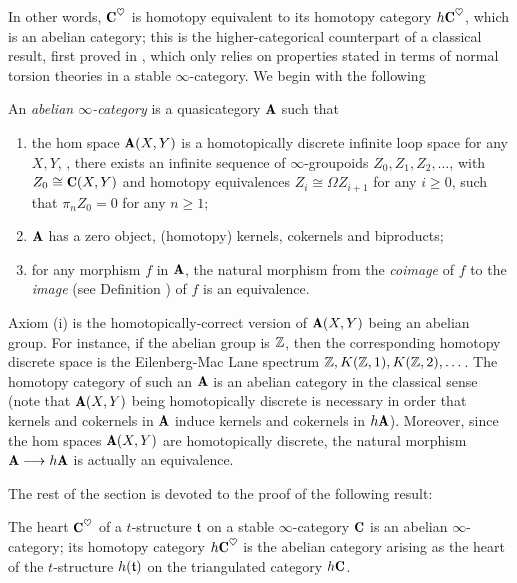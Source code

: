 In other words, $\C^\heart$ is homotopy equivalent to its homotopy category $h\C^\heart$, which is an abelian category; this is the higher-categorical counterpart of a classical result, first proved in \cite[Thm. \textbf{1.3.6}]{BBDPervers}, 
which 
only relies on properties stated in terms of normal torsion theories in a stable $\infty$-category. We begin with the following
\begin{definition}\label{df:abelinfty}
An \emph{abelian $\infty$-category} is a quasicategory $\cate{A}$ such that
\begin{enumerate}
\item the hom space $\cate{A}(X,Y)$ is a homotopically discrete infinite loop space for any $X, Y$, \ie, there exists an infinite sequence of $\infty$-groupoids $Z_0, Z_1,Z_2,\dots$, with $Z_0\cong \C(X,Y)$ and homotopy equivalences $Z_i\cong \Omega Z_{i+1}$ for any $i\geq 0$, such that $\pi_n Z_0=0$ for any $n\geq 1$;
\item $\cate{A}$ has a zero object, (homotopy) kernels, cokernels and biproducts;
\item for any morphism $f$ in $\cate{A}$, the natural morphism from the \emph{coimage} of $f$ to the \emph{image} (see Definition ) of $f$ is an equivalence.
\end{enumerate}
\end{definition}
\begin{remark}
Axiom (i) is the homotopically-correct version of $\cate{A}(X,Y)$ being an abelian group. For instance, if the abelian group is $\mathbb{Z} $, then the corresponding homotopy discrete space is the Eilenberg-Mac Lane spectrum $\mathbb{Z} ,K(\mathbb{Z} ,1), K(\mathbb{Z} ,2),\dots$. The homotopy category of such an $\cate{A}$ is an abelian category in the classical sense (note that $\cate{A}(X,Y)$ being homotopically discrete is necessary in order that kernels and cokernels in $\cate{A}$ induce kernels and cokernels in $h\cate{A}$). Moreover, since the hom spaces $\cate{A}(X,Y)$ are homotopically discrete, the natural morphism $\cate{A}\to h\cate{A}$ is actually an equivalence.
\end{remark}
The rest of the section is devoted to the proof of the following result:
\begin{theorem}\label{heart.is.abelian}
The heart $\C^\heart$ of a $t$-structure $\mathfrak{t}$ on a stable $\infty$-category $\C$ is an abelian $\infty$-category; its homotopy category $h\C^\heart$ is the abelian category arising as the heart of the $t$-structure $h(\mathfrak{t})$ on the triangulated category $h\C$.
\end{theorem}
